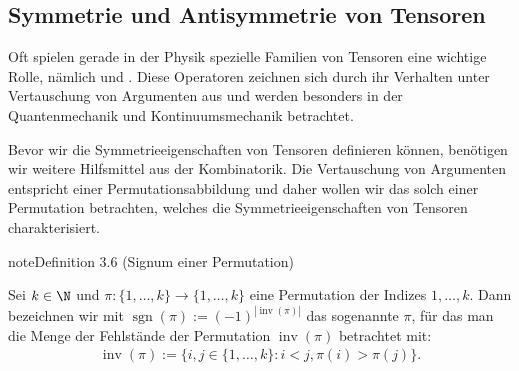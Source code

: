\documentclass[letterpaper,10pt,german]{jupyterBook}
\begin{document}
\subsection{Symmetrie und Antisymmetrie von Tensoren}
\label{\detokenize{vektoranalysis/tensor:symmetrie-und-antisymmetrie-von-tensoren}}\label{\detokenize{vektoranalysis/tensor:s-symtensoren}}
\sphinxAtStartPar
Oft spielen gerade in der Physik spezielle Familien von Tensoren eine wichtige Rolle, nämlich  und .
Diese Operatoren zeichnen sich durch ihr Verhalten unter Vertauschung von Argumenten aus und werden besonders in der Quantenmechanik und Kontinuumsmechanik betrachtet.

\sphinxAtStartPar
Bevor wir die Symmetrieeigenschaften von Tensoren definieren können, benötigen wir weitere Hilfsmittel aus der Kombinatorik.
Die Vertauschung von Argumenten entspricht einer Permutationsabbildung und daher wollen wir das  solch einer Permutation betrachten, welches die Symmetrieeigenschaften von Tensoren charakterisiert.
\label{vektoranalysis/tensor:def:signumPermutation}
\begin{sphinxadmonition}{note}{Definition 3.6 (Signum einer Permutation)}



\sphinxAtStartPar
Sei \(k\in\N\) und \(\pi \colon \lbrace 1,\ldots, k\rbrace \rightarrow \lbrace 1,\ldots, k\rbrace\) eine Permutation der Indizes \(1,\ldots,k\).
Dann bezeichnen wir mit \(\operatorname{sgn}(\pi) := (-1)^{|\operatorname{inv}(\pi)|}\) das sogenannte  \(\pi\), für das man die Menge der Fehlstände der Permutation \(\operatorname{inv}(\pi)\) betrachtet mit:
\begin{equation*}
\begin{split}\operatorname{inv}(\pi) := \lbrace i,j \in \lbrace 1, \ldots, k \rbrace : i < j, \pi(i) > \pi(j) \rbrace.\end{split}
\end{equation*}\end{sphinxadmonition}
\label{vektoranalysis/tensor:remark-26}
\end{document}
